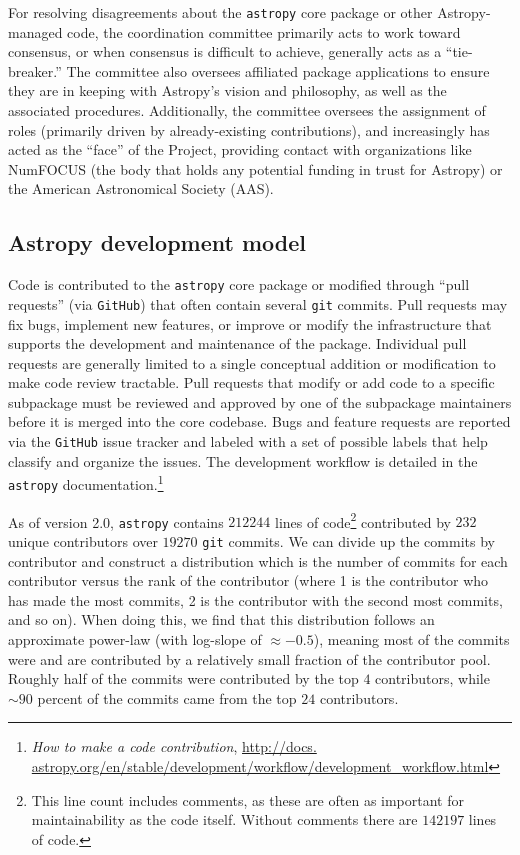 \documentclass[modern]{aastex61}
\newcommand{\package}[1]{\texttt{#1}\xspace}
\newcommand{\github}{\package{GitHub}}
\newcommand{\astropy}{Astropy\xspace}
\newcommand{\astropypkg}{\package{astropy}}
\begin{document}
For resolving disagreements about the \astropypkg core package or other \astropy-managed code, the coordination committee primarily acts to work toward consensus, or when consensus is difficult to achieve, generally acts as a ``tie-breaker.''
The committee also oversees affiliated package applications to ensure they are in keeping with \astropy's vision and philosophy, as well as the associated procedures.
Additionally, the committee oversees the assignment of roles (primarily driven by already-existing contributions), and increasingly has acted as the ``face'' of the Project, providing contact with organizations like NumFOCUS (the body that holds any potential funding in trust for \astropy) or the American Astronomical Society (AAS).

\subsection{Astropy development model}
Code is contributed to the \astropypkg core package or modified through ``pull
requests'' (via \github) that often contain several \texttt{git} commits.
Pull requests may fix bugs, implement new features, or improve or modify the
infrastructure that supports the development and maintenance of the package.
Individual pull requests are generally limited to a single conceptual addition
or modification to make code review tractable.
Pull requests that modify or add code to a specific subpackage must be reviewed
and approved by one of the subpackage maintainers before it is merged into the
core codebase.
Bugs and feature requests are reported via the \github issue tracker and labeled
with a set of possible labels that help classify and organize the issues.
The development workflow is detailed in the \astropypkg
documentation.\footnote{\emph{How to make a code contribution}, \url{http://docs.
astropy.org/en/stable/development/workflow/development_workflow.html}}

As of version 2.0, \astropypkg contains $212244$ lines of code\footnote{This
line count includes comments, as these are often as important for
maintainability as the code itself.  Without comments there are $142197$ lines
of code.} contributed by $232$ unique contributors over $19270$ \texttt{git}
commits. We can divide up the commits by
contributor and construct a distribution which is the number of commits
for each contributor versus the rank of the contributor (where 1 is the
contributor who has made the most commits, 2 is the contributor with the
second most commits, and so on). When doing this, we find that this distribution
follows an approximate power-law (with log-slope of
$\approx -0.5$), meaning most of the commits were and are contributed by a
relatively small fraction of the contributor pool.
Roughly half of the commits were contributed by the top $4$
contributors, while $\sim 90$ percent of the commits came from the top $24$
contributors.
\end{document}

